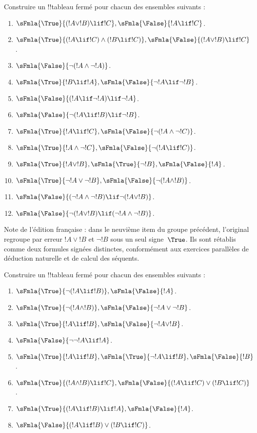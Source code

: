 \documentclass[11pt,a4paper,openany]{memoir}
\begin{document}
\begin{prob}
Construire un !!{tableau} fermé pour chacun des ensembles suivants :
\begin{enumerate}
\item $\sFmla{\True}{(!A \lor !B) \lif !C}, \sFmla{\False}{!A \lif !C}$.
\item $\sFmla{\True}{(!A \lif !C) \land (!B \lif !C)}, \sFmla{\False}{(!A \lor !B) \lif !C}$.
\item $\sFmla{\False}{\lnot(!A \land \lnot !A)}$.
\item $\sFmla{\True}{!B \lif !A}, \sFmla{\False}{\lnot !A \lif \lnot !B}$.
\item $\sFmla{\False}{(!A \lif \lnot !A) \lif \lnot !A}$.
\item $\sFmla{\False}{\lnot(!A \lif !B) \lif \lnot !B}$.
\item $\sFmla{\True}{!A \lif !C}, \sFmla{\False}{\lnot (!A \land \lnot !C)}$.
\item $\sFmla{\True}{!A \land \lnot !C}, \sFmla{\False}{\lnot (!A \lif !C)}$.
\item $\sFmla{\True}{!A \lor !B}, \sFmla{\True}{\lnot !B},
  \sFmla{\False}{!A}$.
\item $\sFmla{\True}{\lnot !A \lor \lnot !B}, \sFmla{\False}{\lnot(!A \land !B)}$.
\item $\sFmla{\False}{(\lnot !A \land \lnot !B) \lif\lnot(!A \lor !B)}$.
\item $\sFmla{\False}{\lnot(!A \lor !B) \lif (\lnot !A \land \lnot !B)}$.
\end{enumerate}
\end{prob}

\begin{editorial}
Note de l'édition française : dans le neuvième item du groupe précédent,
l'original regroupe par erreur $!A \lor !B$ et $\lnot !B$ sous un seul
signe~$\True$. Ils sont rétablis comme deux formules signées distinctes,
conformément aux exercices parallèles de déduction naturelle et de
calcul des séquents.
\end{editorial}

\begin{prob}
Construire un !!{tableau} fermé pour chacun des ensembles suivants :
\begin{enumerate}
\item $\sFmla{\True}{\lnot(!A \lif !B)}, \sFmla{\False}{!A}$.
\item $\sFmla{\True}{\lnot(!A \land !B)}, \sFmla{\False}{\lnot !A \lor \lnot !B}$.
\item $\sFmla{\True}{!A \lif !B}, \sFmla{\False}{\lnot !A \lor !B}$.
\item $\sFmla{\False}{\lnot \lnot !A \lif !A}$.
\item $\sFmla{\True}{!A \lif !B}, \sFmla{\True}{\lnot !A \lif !B}, \sFmla{\False}{!B}$.
\item $\sFmla{\True}{(!A \land !B) \lif !C}, \sFmla{\False}{(!A \lif !C) \lor (!B \lif !C)}$.
\item $\sFmla{\True}{(!A \lif !B) \lif !A}, \sFmla{\False}{!A}$.
\item $\sFmla{\False}{(!A \lif !B) \lor (!B \lif !C)}$.
\end{enumerate}
\end{prob}
\end{document}

